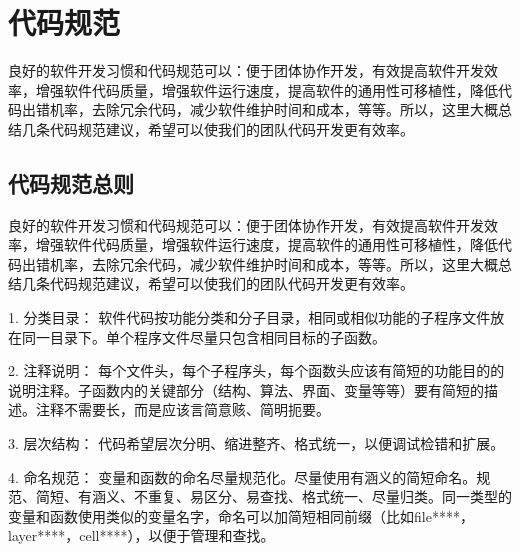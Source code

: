 
\resetdatestamp %

\chapter*{代码规范} \label{ChCodeRule}

\pagestyle{fancy} \fancyhead[RO,RE]{}
\fancyhead[LE]{\MakeUppercase{\leftmark}}
\fancyhead[LO]{\MakeUppercase{\rightmark}}
\fancyfoot[C]{\thepage} %

良好的软件开发习惯和代码规范可以：便于团体协作开发，有效提高软件开发效率，增强软件代码质量，增强软件运行速度，提高软件的通用性可移植性，降低代码出错机率，去除冗余代码，减少软件维护时间和成本，等等。所以，这里大概总结几条代码规范建议，希望可以使我们的团队代码开发更有效率。

\section{代码规范总则} \label{SectCodeRuleDeng}
良好的软件开发习惯和代码规范可以：便于团体协作开发，有效提高软件开发效率，增强软件代码质量，增强软件运行速度，提高软件的通用性可移植性，降低代码出错机率，去除冗余代码，减少软件维护时间和成本，等等。所以，这里大概总结几条代码规范建议，希望可以使我们的团队代码开发更有效率。

1.	分类目录：
软件代码按功能分类和分子目录，相同或相似功能的子程序文件放在同一目录下。单个程序文件尽量只包含相同目标的子函数。

2.	注释说明：
每个文件头，每个子程序头，每个函数头应该有简短的功能目的的说明注释。子函数内的关键部分（结构、算法、界面、变量等等）要有简短的描述。注释不需要长，而是应该言简意赅、简明扼要。

3.	层次结构：
代码希望层次分明、缩进整齐、格式统一，以便调试检错和扩展。

4.	命名规范：
变量和函数的命名尽量规范化。尽量使用有涵义的简短命名。规范、简短、有涵义、不重复、易区分、易查找、格式统一、尽量归类。同一类型的变量和函数使用类似的变量名字，命名可以加简短相同前缀（比如file****，layer****，cell****），以便于管理和查找。

